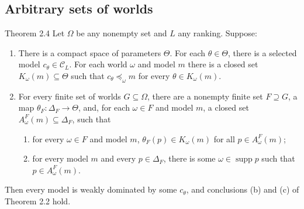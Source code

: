 \documentclass[11pt]{article}
\newcommand{\C}{\mathcal C}
\newcommand{\supp}{\operatorname{supp}}
\begin{document}
\subsection*{Arbitrary sets of worlds}
\begin{stmt}{Theorem 2.4}
Let $\Omega$ be any nonempty set and $L$ any ranking. Suppose:
\begin{enumerate}[label=\arabic*.,leftmargin=*]
\item There is a compact space of parameters $\Theta$. For each $\theta\in\Theta$, there is a selected model $c_\theta\in\C_L$. For each world $\omega$ and model $m$ there is a closed set $K_\omega(m)\subseteq\Theta$ such that $c_\theta\preceq_\omega m$ for every $\theta\in K_\omega(m)$.
\item For every finite set of worlds $G\subseteq\Omega$, there are a nonempty finite set $F\supseteq G$, a map $\theta_F:\Delta_F\to\Theta$, and, for each $\omega\in F$ and model $m$, a closed set $A^F_\omega(m)\subseteq\Delta_F$, such that
\begin{enumerate}[label=(\alph*)]
\item for every $\omega\in F$ and model $m$, $\theta_F(p)\in K_\omega(m)$ for all $p\in A^F_\omega(m)$;
\item for every model $m$ and every $p\in\Delta_F$, there is some $\omega\in\supp p$ such that $p\in A^F_\omega(m)$.
\end{enumerate}
\end{enumerate}
Then every model is weakly dominated by some $c_\theta$, and conclusions (b) and (c) of Theorem 2.2 hold.
\end{stmt}
\end{document}
